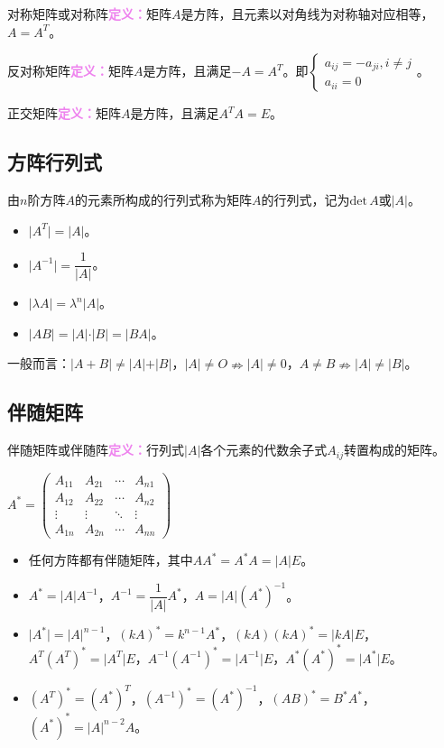 \documentclass[UTF8, 12pt]{ctexart}
\begin{document}
对称矩阵或对称阵\textcolor{violet}{\textbf{定义：}}矩阵$A$是方阵，且元素以对角线为对称轴对应相等，$A=A^T$。

反对称矩阵\textcolor{violet}{\textbf{定义：}}矩阵$A$是方阵，且满足$-A=A^T$。即$\left\{\begin{array}{l}
    a_{ij}=-a_{ji},i\neq j \\
    a_{ii}=0
\end{array}\right.$。

正交矩阵\textcolor{violet}{\textbf{定义：}}矩阵$A$是方阵，且满足$A^TA=E$。

\subsection{方阵行列式}

由$n$阶方阵$A$的元素所构成的行列式称为矩阵$A$的行列式，记为$\textrm{det}\,A$或$\vert A\vert$。

\begin{itemize}
    \item $\vert A^T\vert=\vert A\vert$。
    \item $\vert A^{-1}\vert=\dfrac{1}{\vert A\vert}$。
    \item $\vert\lambda A\vert=\lambda^n\vert A\vert$。
    \item $\vert AB\vert=\vert A\vert\cdot\vert B\vert=\vert BA\vert$。
\end{itemize}

一般而言：$\vert A+B\vert\neq\vert A\vert+\vert B\vert$，$\vert A\vert\neq O\nRightarrow\vert A\vert\neq0$，$A\neq B\nRightarrow\vert A\vert\neq\vert B\vert$。

\subsection{伴随矩阵}

伴随矩阵或伴随阵\textcolor{violet}{\textbf{定义：}}行列式$\vert A\vert$各个元素的代数余子式$A_{ij}$转置构成的矩阵。

$A^*=\left(
    \begin{array}{cccc}
        A_{11} & A_{21} & \cdots & A_{n1} \\
        A_{12} & A_{22} & \cdots & A_{n2} \\
        \vdots & \vdots & \ddots & \vdots \\
        A_{1n} & A_{2n} & \cdots & A_{nn}
    \end{array}
\right)$

\begin{itemize}
    \item 任何方阵都有伴随矩阵，其中$AA^*=A^*A=\vert A\vert E$。
    \item $A^*=\vert A\vert A^{-1}$，$A^{-1}=\dfrac{1}{\vert A\vert}A^*$，$A=\vert A\vert(A^*)^{-1}$。
    \item $\vert A^*\vert=\vert A\vert^{n-1}$，$(kA)^*=k^{n-1}A^*$，$(kA)(kA)^*=\vert kA\vert E$，$A^T(A^T)^*=\vert A^T\vert E$，$A^{-1}(A^{-1})^*=\vert A^{-1}\vert E$，$A^*(A^*)^*=\vert A^*\vert E$。
    \item $(A^T)^*=(A^*)^T$，$(A^{-1})^*=(A^*)^{-1}$，$(AB)^*=B^*A^*$，$(A^*)^*=\vert A\vert^{n-2}A$。
\end{itemize}
\end{document}
